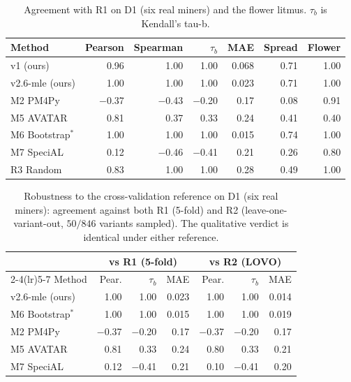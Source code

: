 \documentclass[runningheads]{llncs}
\begin{document}
\begin{table}[t]
\centering
\caption{Agreement with R1 on D1 (six real miners) and the flower litmus. $\tau_b$ is Kendall's tau-b.}
\label{tab:corr}
\setlength{\tabcolsep}{4.5pt}
\footnotesize
\begin{tabular}{@{}lrrrrrr@{}}
\toprule
Method & Pearson & Spearman & $\tau_b$ & MAE & Spread & Flower \\
\midrule
v1 (ours)        & 0.96 & 1.00 & 1.00 & 0.068 & 0.71 & 1.00 \\
v2.6-mle (ours)  & 1.00 & 1.00 & 1.00 & 0.023 & 0.71 & 1.00 \\
M2 PM4Py         & $-$0.37 & $-$0.43 & $-$0.20 & 0.17 & 0.08 & 0.91 \\
M5 AVATAR        & 0.81 & 0.37 & 0.33 & 0.24 & 0.41 & 0.40 \\
M6 Bootstrap$^{*}$ & 1.00 & 1.00 & 1.00 & 0.015 & 0.74 & 1.00 \\
M7 SpeciAL       & 0.12 & $-$0.46 & $-$0.41 & 0.21 & 0.26 & 0.80 \\
R3 Random        & 0.83 & 1.00 & 1.00 & 0.28 & 0.49 & 1.00 \\
\bottomrule
\end{tabular}
\end{table}

\begin{table}[t]
\centering
\caption{Robustness to the cross-validation reference on D1 (six real miners): agreement against both R1 (5-fold) and R2 (leave-one-variant-out, $50/846$ variants sampled). The qualitative verdict is identical under either reference.}
\label{tab:r2}
\setlength{\tabcolsep}{5pt}
\footnotesize
\begin{tabular}{@{}lrrrrrr@{}}
\toprule
 & \multicolumn{3}{c}{vs R1 (5-fold)} & \multicolumn{3}{c}{vs R2 (LOVO)} \\
\cmidrule(lr){2-4}\cmidrule(lr){5-7}
Method & Pear. & $\tau_b$ & MAE & Pear. & $\tau_b$ & MAE \\
\midrule
v2.6-mle (ours)    & 1.00 & 1.00 & 0.023 & 1.00 & 1.00 & 0.014 \\
M6 Bootstrap$^{*}$ & 1.00 & 1.00 & 0.015 & 1.00 & 1.00 & 0.019 \\
M2 PM4Py           & $-$0.37 & $-$0.20 & 0.17 & $-$0.37 & $-$0.20 & 0.17 \\
M5 AVATAR          & 0.81 & 0.33 & 0.24 & 0.80 & 0.33 & 0.21 \\
M7 SpeciAL         & 0.12 & $-$0.41 & 0.21 & 0.10 & $-$0.41 & 0.20 \\
\bottomrule
\end{tabular}
\end{table}
\end{document}
